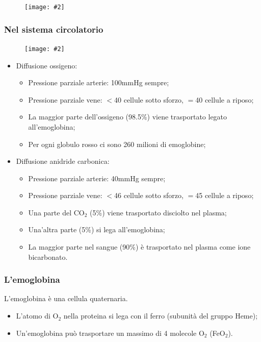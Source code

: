 \documentclass{article}
\newcommand{\cfig}[2]{
    \phantom{}
    \begin{figure}[ht!]
        \begin{center}
            \texttt{[image: \#2]}
        \end{center}
    \end{figure}
}
\begin{document}
\cfig{.8}{media/alveoli.png}

\subsubsection{Nel sistema circolatorio}

\cfig{.8}{media/diffusione-gas.png}

\begin{itemize}
    \item Diffusione ossigeno:
        \begin{itemize}
            \item Pressione parziale arterie: 100mmHg sempre;
            \item Pressione parziale vene: $<$40 cellule sotto sforzo, $=$40 cellule a riposo;
            \item La maggior parte dell'ossigeno (98.5\%) viene trasportato legato
                all'emoglobina;
            \item Per ogni globulo rosso ci sono 260 milioni di emoglobine;
        \end{itemize}
    \item Diffusione anidride carbonica:
        \begin{itemize}
            \item Pressione parziale arterie: 40mmHg sempre;
            \item Pressione parziale vene: $<$46 cellule sotto sforzo, $=$45 cellule a riposo;
            \item Una parte del CO$_2$ (5\%) viene trasportato disciolto nel plasma;
            \item Una'altra parte (5\%) si lega all'emoglobina;
            \item La maggior parte nel sangue (90\%) è trasportato nel plasma come ione
                bicarbonato.
        \end{itemize}
\end{itemize}

\subsubsection{L'emoglobina}
L'emoglobina è una cellula quaternaria. 
\begin{itemize}
    \item L'atomo di O$_2$ nella proteina si lega con il ferro (subunità del gruppo Heme);
    \item Un'emoglobina può trasportare un massimo di 4 molecole O$_2$ (FeO$_2$).
\end{itemize}
\end{document}
